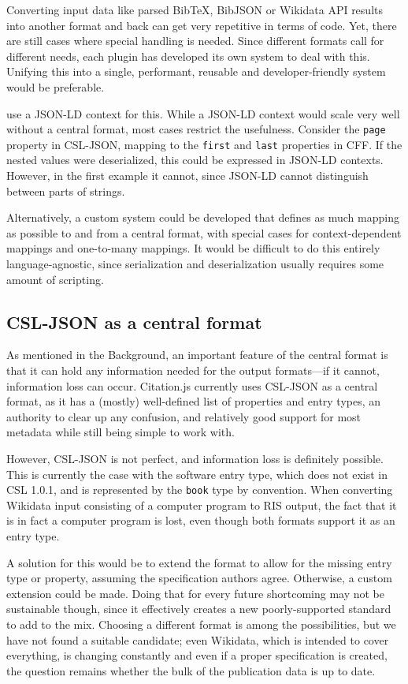 \documentclass[fleqn,10pt,lineno]{wlpeerj} %
\begin{document}
Converting input data like parsed BibTeX, BibJSON or Wikidata API results into another format and back can get very repetitive in terms of code. Yet, there are still cases where special handling is needed. Since different formats call for different needs, each plugin has developed its own system to deal with this. Unifying this into a single, performant, reusable and developer-friendly system would be preferable.

\cite{jones_codemeta:_2017} use a JSON-LD context for this. While a JSON-LD context would scale very well without a central format, most cases restrict the usefulness. Consider the \texttt{page} property in CSL-JSON, mapping to the \texttt{first} and \texttt{last} properties in CFF. If the nested values were deserialized, this could be expressed in JSON-LD contexts. However, in the first example it cannot, since JSON-LD cannot distinguish between parts of strings.

Alternatively, a custom system could be developed that defines as much mapping as possible to and from a central format, with special cases for context-dependent mappings and one-to-many mappings. It would be difficult to do this entirely language-agnostic, since serialization and deserialization usually requires some amount of scripting.

\subsection*{CSL-JSON as a central format}

As mentioned in the Background, an important feature of the central format is that it can hold any information needed for the output formats---if it cannot, information loss can occur. Citation.js currently uses CSL-JSON as a central format, as it has a (mostly) well-defined list of properties and entry types, an authority to clear up any confusion, and relatively good support for most metadata while still being simple to work with.

However, CSL-JSON is not perfect, and information loss is definitely possible. This is currently the case with the software entry type, which does not exist in CSL 1.0.1, and is represented by the \texttt{book} type by convention. When converting Wikidata input consisting of a computer program to RIS output, the fact that it is in fact a computer program is lost, even though both formats support it as an entry type.

A solution for this would be to extend the format to allow for the missing entry type or property, assuming the specification authors agree. Otherwise, a custom extension could be made. Doing that for every future shortcoming may not be sustainable though, since it effectively creates a new poorly-supported standard to add to the mix. Choosing a different format is among the possibilities, but we have not found a suitable candidate; even Wikidata, which is intended to cover everything, is changing constantly and even if a proper specification is created, the question remains whether the bulk of the publication data is up to date.
\end{document}
